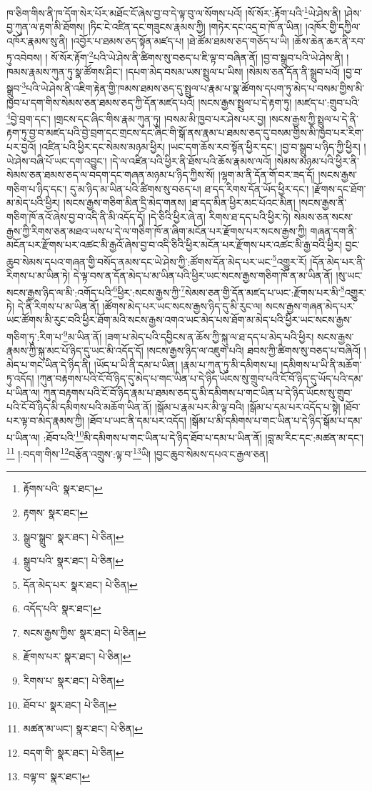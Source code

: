 ཁ་ཅིག་གིས་ནི་ཁ་དོག་སེར་པོར་མཐོང་ངོ་ཞེས་བྱ་བ་དེ་ལྟ་བུ་ལ་སོགས་པའོ། །སོ་སོར་:རྟོག་པའི་\footnote{རྟོགས་པའི་  སྣར་ཐང་། }ཡེ་ཤེས་ནི། །ཤེས་བྱ་ཀུན་ལ་རྟག་མི་ཐོགས། །ཏིང་ངེ་འཛིན་དང་གཟུངས་རྣམས་ཀྱི། །གཏེར་དང་འདྲ་བ་ཁོ་ན་ཡིན། །འཁོར་གྱི་དཀྱིལ་འཁོར་རྣམས་སུ་ནི། །འབྱོར་པ་ཐམས་ཅད་སྟོན་མཛད་པ། །ཐེ་ཚོམ་ཐམས་ཅད་གཅོད་པ་ཡི། །ཆོས་ཆེན་ཆར་ནི་རབ་ཏུ་འབེབས། །
སོ་སོར་རྟོག་\footnote{རྟགས་  སྣར་ཐང་། }པའི་ཡེ་ཤེས་ནི་ཚིགས་སུ་བཅད་པ་ཇི་ལྟ་བ་བཞིན་ནོ། །བྱ་བ་སྒྲུབ་པའི་ཡེ་ཤེས་ནི། །ཁམས་རྣམས་ཀུན་ཏུ་སྣ་ཚོགས་ཤིང་། །དཔག་མེད་བསམ་ཡས་སྤྲུལ་པ་ཡིས། །སེམས་ཅན་དོན་ནི་སྒྲུབ་པའོ། །བྱ་བ་སྒྲུབ་\footnote{སྒྲུབ་སྒྲུབ་  སྣར་ཐང་།  པེ་ཅིན། }པའི་ཡེ་ཤེས་ནི་འཇིག་རྟེན་གྱི་ཁམས་ཐམས་ཅད་དུ་སྤྲུལ་པ་རྣམ་པ་སྣ་ཚོགས་དཔག་ཏུ་མེད་པ་བསམ་གྱིས་མི་ཁྱབ་པ་དག་གིས་སེམས་ཅན་ཐམས་ཅད་ཀྱི་དོན་མཛད་པའོ། །སངས་རྒྱས་སྤྲུལ་པ་དེ་རྟག་ཏུ། །མཛད་པ་:གྲུབ་པའི་\footnote{སྒྲུབ་པའི་  སྣར་ཐང་།  པེ་ཅིན། }བྱེ་བྲག་དང་། །གྲངས་དང་ཞིང་གིས་རྣམ་ཀུན་ཏུ། །བསམ་མི་ཁྱབ་པར་ཤེས་པར་བྱ། །སངས་རྒྱས་ཀྱི་སྤྲུལ་པ་དེ་ནི་རྟག་ཏུ་བྱ་བ་མཛད་པའི་བྱེ་བྲག་དང་གྲངས་དང་ཞིང་གི་སྒོ་ནས་རྣམ་པ་ཐམས་ཅད་དུ་བསམ་གྱིས་མི་ཁྱབ་པར་རིག་པར་བྱའོ། །འཛིན་པའི་ཕྱིར་དང་སེམས་མཉམ་ཕྱིར། །ཡང་དག་ཆོས་རབ་སྟོན་ཕྱིར་དང་། །བྱ་བ་སྒྲུབ་པ་ཉིད་ཀྱི་ཕྱིར། །ཡེ་ཤེས་བཞི་པོ་ཡང་དག་འབྱུང་། །དེ་ལ་འཛིན་པའི་ཕྱིར་ནི་ཐོས་པའི་ཆོས་རྣམས་ལའོ། །སེམས་མཉམ་པའི་ཕྱིར་ནི་སེམས་ཅན་ཐམས་ཅད་ལ་བདག་དང་གཞན་མཉམ་པ་ཉིད་ཀྱིས་སོ། །ལྷག་མ་ནི་དོན་གོ་བར་ཟད་དོ། །སངས་རྒྱས་གཅིག་པ་ཉིད་དང་། དུ་མ་ཉིད་མ་ཡིན་པའི་ཚིགས་སུ་བཅད་པ། ཐ་དད་རིགས་དོན་ཡོད་ཕྱིར་དང་། །རྫོགས་དང་ཐོག་མ་མེད་པའི་ཕྱིར། །སངས་རྒྱས་གཅིག་མིན་དྲི་མེད་གནས། །ཐ་དད་མིན་ཕྱིར་མང་པོའང་མིན། །སངས་རྒྱས་ནི་གཅིག་ཁོ་ནའོ་ཞེས་བྱ་བ་འདི་ནི་མི་འདོད་དོ། །དེ་ཅིའི་ཕྱིར་ཞེ་ན། རིགས་ཐ་དད་པའི་ཕྱིར་ཏེ། སེམས་ཅན་སངས་རྒྱས་ཀྱི་རིགས་ཅན་མཐའ་ཡས་པ་དེ་ལ་གཅིག་ཁོ་ན་ཞིག་མངོན་པར་རྫོགས་པར་སངས་རྒྱས་ཀྱི། གཞན་དག་ནི་མངོན་པར་རྫོགས་པར་འཚང་མི་རྒྱའོ་ཞེས་བྱ་བ་འདི་ཅིའི་ཕྱིར་མངོན་པར་རྫོགས་པར་འཚང་མི་རྒྱ་བའི་ཕྱིར། བྱང་ཆུབ་སེམས་དཔའ་གཞན་གྱི་བསོད་ནམས་དང་ཡེ་ཤེས་ཀྱི་:ཚོགས་དོན་མེད་པར་ཡང་\footnote{དོན་མེད་པར་  སྣར་ཐང་།  པེ་ཅིན། }འགྱུར་རོ། །དོན་མེད་པར་ནི་རིགས་པ་མ་ཡིན་ཏེ། དེ་ལྟ་བས་ན་དོན་མེད་པ་མ་ཡིན་པའི་ཕྱིར་ཡང་སངས་རྒྱས་གཅིག་ཁོ་ན་མ་ཡིན་ནོ། །སུ་ཡང་སངས་རྒྱས་ཉིད་ལ་མི་:འགོད་པའི་\footnote{འདོད་པའི་  སྣར་ཐང་། }ཕྱིར་:སངས་རྒྱས་ཀྱི་\footnote{སངས་རྒྱས་ཀྱིས་  སྣར་ཐང་།  པེ་ཅིན། }སེམས་ཅན་གྱི་དོན་མཛད་པ་ཡང་:རྫོགས་པར་མི་\footnote{རྫོགས་པར་  སྣར་ཐང་།  པེ་ཅིན། }འགྱུར་ཏེ། དེ་ནི་རིགས་པ་མ་ཡིན་ནོ། །ཚོགས་མེད་པར་ཡང་སངས་རྒྱས་ཉིད་དུ་མི་རུང་ལ། སངས་རྒྱས་གཞན་མེད་པར་ཡང་ཚོགས་མི་རུང་བའི་ཕྱིར་ཐོག་མའི་སངས་རྒྱས་འགའ་ཡང་མེད་པས་ཐོག་མ་མེད་པའི་ཕྱིར་ཡང་སངས་རྒྱས་གཅིག་ཏུ་:རིག་པ་\footnote{རིགས་པ་  སྣར་ཐང་།  པེ་ཅིན། }མ་ཡིན་ནོ། །ཟག་པ་མེད་པའི་དབྱིངས་ན་ཆོས་ཀྱི་སྐུ་ལ་ཐ་དད་པ་མེད་པའི་ཕྱིར། སངས་རྒྱས་རྣམས་ཀྱི་སྐུ་མང་པོ་ཉིད་དུ་ཡང་མི་འདོད་དོ། །སངས་རྒྱས་ཉིད་ལ་འཇུག་པའི། ཐབས་ཀྱི་ཚིགས་སུ་བཅད་པ་བཞིའོ། །མེད་པ་གང་ཡིན་དེ་ཉིད་ནི། །ཡོད་པ་ཡི་ནི་དམ་པ་ཡིན། །རྣམ་པ་ཀུན་ཏུ་མི་དམིགས་པ། །དམིགས་པ་ཡི་ནི་མཆོག་ཏུ་འདོད། །ཀུན་བརྟགས་པའི་ངོ་བོ་ཉིད་དུ་མེད་པ་གང་ཡིན་པ་དེ་ཉིད་ཡོངས་སུ་གྲུབ་པའི་ངོ་བོ་ཉིད་དུ་ཡོད་པའི་དམ་པ་ཡིན་ལ། ཀུན་བརྟགས་པའི་ངོ་བོ་ཉིད་རྣམ་པ་ཐམས་ཅད་དུ་མི་དམིགས་པ་གང་ཡིན་པ་དེ་ཉིད་ཡོངས་སུ་གྲུབ་པའི་ངོ་བོ་ཉིད་མི་དམིགས་པའི་མཆོག་ཡིན་ནོ། །སྒོམ་པ་རྣམ་པར་མི་ལྟ་བའི། །སྒོམ་པ་དམ་པར་འདོད་པ་སྟེ། །ཐོབ་པར་ལྟ་བ་མེད་རྣམས་ཀྱི། །ཐོབ་པ་ཡང་ནི་དམ་པར་འདོད། །སྒོམ་པ་མི་དམིགས་པ་གང་ཡིན་པ་དེ་ཉིད་སྒོམ་པ་དམ་པ་ཡིན་ལ། :ཐོབ་པའི་\footnote{ཐོབ་པ་  སྣར་ཐང་།  པེ་ཅིན། }མི་དམིགས་པ་གང་ཡིན་པ་དེ་ཉིད་ཐོབ་པ་དམ་པ་ཡིན་ནོ། །བླ་མ་རིང་དང་:མཚན་མ་དང་།\footnote{མཚན་མ་ཡང་།  སྣར་ཐང་།  པེ་ཅིན། } །:བདག་གིས་\footnote{བདག་གི་  སྣར་ཐང་།  པེ་ཅིན། }བརྩོན་འགྲུས་:ལྟ་བ་\footnote{བལྟ་བ་  སྣར་ཐང་། }ཡི། །བྱང་ཆུབ་སེམས་དཔའ་ང་རྒྱལ་ཅན། 